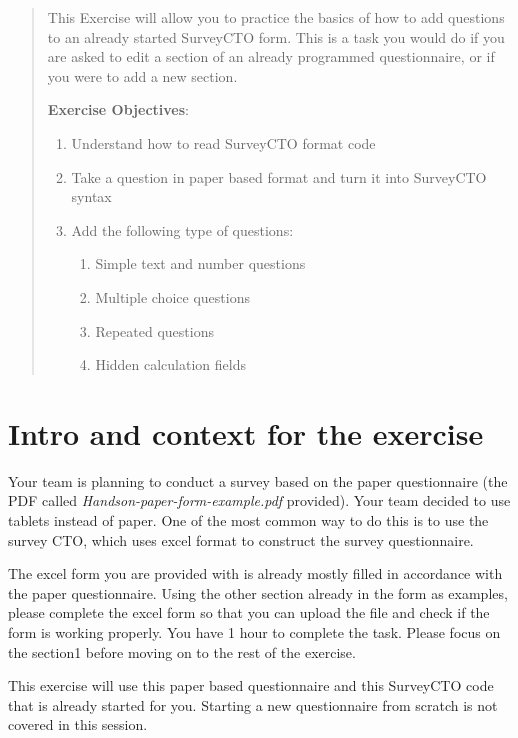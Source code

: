 \documentclass{tufte-handout}
\begin{document}
\begin{abstract}
This Exercise will allow you to practice the basics of how to add questions to an already started SurveyCTO form. This is a task you would do if you are asked to edit a section of an already programmed questionnaire, or if you were to add a new section.


\bigskip\noindent \textbf{Exercise Objectives}:
\begin{enumerate}
  \item Understand how to read SurveyCTO format code
  \item Take a question in paper based format and turn it into SurveyCTO syntax
  \item Add the following type of questions:
  \begin{enumerate}
  	\item Simple text and number questions
  	\item Multiple choice questions
  	\item Repeated questions
	\item Hidden calculation fields
  \end{enumerate}
\end{enumerate}
\end{abstract}

\section{Intro and context for the exercise}

Your team is planning to conduct a survey based on the paper questionnaire (the PDF called \textit{Handson-paper-form-example.pdf} provided). Your team decided to use tablets instead of paper. One of the most common way to do this is to use the survey CTO, which uses excel format to construct the survey questionnaire. 

The excel form you are provided with is already mostly filled in accordance with the paper questionnaire. Using the other section already in the form as examples, please complete the excel form so that you can upload the file and check if the form is working properly. You have 1 hour to complete the task. Please focus on the section1 before moving on to the rest of the exercise. 

This exercise will use this paper based questionnaire and this SurveyCTO code that is already started for you. Starting a new questionnaire from scratch is not covered in this session.
\end{document}
